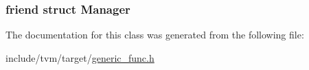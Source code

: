 \subsubsection[{\texorpdfstring{Manager}{Manager}}]{\setlength{\rightskip}{0pt plus 5cm}friend struct Manager\hspace{0.3cm}{\ttfamily [friend]}}\hypertarget{classtvm_1_1GenericFunc_a1fd6b9bc3f72bb2b64e602de3982929d}{}\label{classtvm_1_1GenericFunc_a1fd6b9bc3f72bb2b64e602de3982929d}


The documentation for this class was generated from the following file\+:\begin{DoxyCompactItemize}
\item 
include/tvm/target/\hyperlink{generic__func_8h}{generic\+\_\+func.\+h}\end{DoxyCompactItemize}
